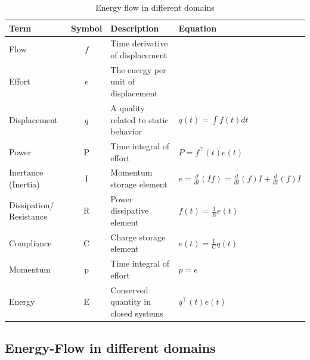 \begin{table}[H]
    \centering
    \begin{tabular}{|m{6em}|c|m{12em}|m{14em}|}
        \hline
        Term    & Symbol    & Description   & Equation 
        \\\hline
        Flow    & $f$       & Time derivative of displacement & 
        \\\hline
        Effort  & $e$       & The energy per unit of displacement & 
        \\\hline
        Displacement    & $q$   & A quality related to static behavior  & $q(t)=\int f(t)dt$
        \\\hline
        Power&	P&	Time integral of effort	& $P=f^\top(t)e(t)$
        \\\hline
        Inertance (Inertia)	& I	& Momentum storage element	& $e=\frac{d}{dt}(If)=\frac{d}{dt}(f)I+\frac{d}{dt}(f)I$
        \\\hline
        Dissipation/ Resistance & R & Power dissipative element	& $f(t)=\frac{1}{R}e(t)$
        \\\hline
        Compliance	& C	& Charge storage element &	$e(t)=\frac{1}{C}q(t)$
        \\\hline
        Momentum &	p &	Time integral of effort &	$\dot{p}=e$
        \\\hline
        Energy	& E	& Conserved quantity in closed systems& 	$q^\top(t)e(t)$
        \\\hline
    \end{tabular}
    \caption{Energy flow in different domains}
    \label{tab:my_label}
\end{table}

\subsection{Energy-Flow in different domains}

